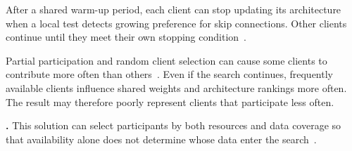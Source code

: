  After a shared warm-up period, each client can stop updating its architecture when a local test detects growing preference for skip connections. Other clients continue until they meet their own stopping condition~\cite{collaborative_nas_for_pfl_2025}.

Partial participation and random client selection can cause some clients to contribute more often than others~\cite{optimize_fednas_edge_2021,peaches_2024}. Even if the search continues, frequently available clients influence shared weights and architecture rankings more often. The result may therefore poorly represent clients that participate less often.

\noindent\textbf{.} This solution can select participants by both resources and data coverage so that availability alone does not determine whose data enter the search~\cite{network_aware_fed_nas_2025,finch_2024}.
